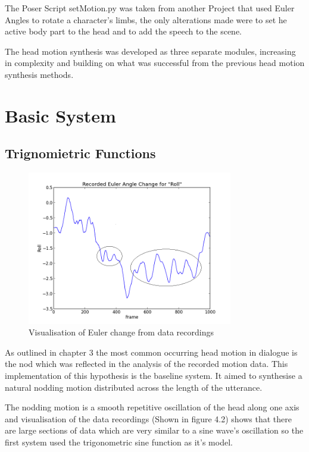 \documentclass[bsc,frontabs,twoside,singlespacing,parskip]{infthesis}
\begin{document}
The Poser Script setMotion.py was taken from another Project that used Euler Angles to rotate a character's limbs, the only alterations made were to set he active body part to the head and to add the speech to the scene.

The head motion synthesis was developed as three separate modules, increasing in complexity and building on what was successful from the previous head motion synthesis methods.

\section{Basic System} 

\subsection{Trignomietric Functions}

\begin{figure}
	\centering
	\includegraphics[width=0.8\textwidth]{euler_change.png}
	\caption{Visualisation of Euler change from data recordings}
\end{figure}

As outlined in chapter 3 the most common occurring head motion in dialogue is the nod which was reflected in the analysis of the recorded motion data. This implementation of this hypothesis is the baseline system. It aimed to synthesise a natural nodding motion distributed across the length of the utterance.

The nodding motion is a smooth repetitive oscillation of the head along one axis and visualisation of the data recordings (Shown in figure 4.2) shows that there are large sections of data which are very similar to a sine wave's oscillation so the first system used the trigonometric sine function as it's model.
\end{document}
